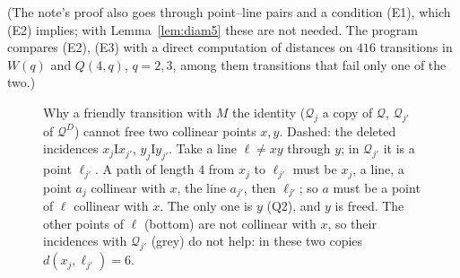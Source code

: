 \documentclass[11pt]{amsart}
\theoremstyle{definition}
\theoremstyle{remark}
\newcommand{\I}{\mathrel{\mathrm{I}}}
\newcommand{\cQ}{\mathcal{Q}}
\begin{document}
(The note's proof also goes through point--line pairs and a condition (E1), which (E2) implies; with Lemma~\ref{lem:diam5} these are not needed. The program  compares (E2), (E3) with a direct computation of distances on $416$ transitions in $W(q)$ and $Q(4,q)$, $q=2,3$, among them transitions that fail only one of the two.)

\begin{figure}[ht]
\centering
{}
\caption{Why a friendly transition with $M$ the identity ($\cQ_j$ a copy of $\cQ$, $\cQ_{j'}$ of $\cQ^D$) cannot free two collinear points $x,y$. Dashed: the deleted incidences $x_j\I x_{j'}$, $y_j\I y_{j'}$. Take a line $\ell\ne xy$ through $y$; in $\cQ_{j'}$ it is a point $\ell_{j'}$. A path of length $4$ from $x_j$ to $\ell_{j'}$ must be $x_j$, a line, a point $a_j$ collinear with $x$, the line $a_{j'}$, then $\ell_{j'}$; so $a$ must be a point of $\ell$ collinear with $x$. The only one is $y$ (Q2), and $y$ is freed. The other points of $\ell$ (bottom) are not collinear with $x$, so their incidences with $\cQ_{j'}$ (grey) do not help: in these two copies $d(x_j,\ell_{j'})=6$.}
\label{fig:collinearpair}
\end{figure}
\end{document}
